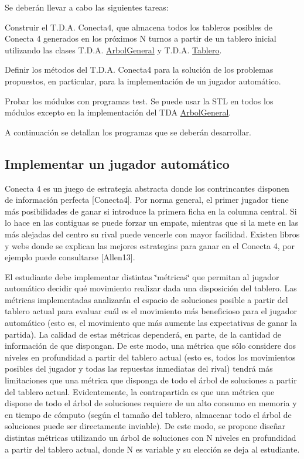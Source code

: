 Se deberán llevar a cabo las siguientes tareas\-:


\begin{DoxyEnumerate}
\item Construir el T.\-D.\-A. Conecta4, que almacena todos los tableros posibles de Conecta 4 generados en los próximos N turnos a partir de un tablero inicial utilizando las clases T.\-D.\-A. \hyperlink{classArbolGeneral}{Arbol\-General} y T.\-D.\-A. \hyperlink{classTablero}{Tablero}.
\item Definir los métodos del T.\-D.\-A. Conecta4 para la solución de los problemas propuestos, en particular, para la implementación de un jugador automático.
\item Probar los módulos con programas test. Se puede usar la S\-T\-L en todos los módulos excepto en la implementación del T\-D\-A \hyperlink{classArbolGeneral}{Arbol\-General}.
\end{DoxyEnumerate}

A continuación se detallan los programas que se deberán desarrollar.\hypertarget{index_jugador_automatico}{}\subsection{Implementar un jugador automático}\label{index_jugador_automatico}
Conecta 4 es un juego de estrategia abstracta donde los contrincantes disponen de información perfecta \mbox{[}Conecta4\mbox{]}. Por norma general, el primer jugador tiene más posibilidades de ganar si introduce la primera ficha en la columna central. Si lo hace en las contiguas se puede forzar un empate, mientras que si la mete en las más alejadas del centro su rival puede vencerle con mayor facilidad. Existen libros y webs donde se explican las mejores estrategias para ganar en el Conecta 4, por ejemplo puede consultarse \mbox{[}Allen13\mbox{]}.

El estudiante debe implementar distintas \char`\"{}métricas\char`\"{} que permitan al jugador automático decidir qué movimiento realizar dada una disposición del tablero. Las métricas implementadas analizarán el espacio de soluciones posible a partir del tablero actual para evaluar cuál es el movimiento más beneficioso para el jugador automático (esto es, el movimiento que más aumente las expectativas de ganar la partida). La calidad de estas métricas dependerá, en parte, de la cantidad de información de que dispongan. De este modo, una métrica que sólo considere dos niveles en profundidad a partir del tablero actual (esto es, todos los movimientos posibles del jugador y todas las repuestas inmediatas del rival) tendrá más limitaciones que una métrica que disponga de todo el árbol de soluciones a partir del tablero actual. Evidentemente, la contrapartida es que una métrica que dispone de todo el árbol de soluciones requiere de un alto consumo en memoria y en tiempo de cómputo (según el tamaño del tablero, almacenar todo el árbol de soluciones puede ser directamente inviable). De este modo, se propone diseñar distintas métricas utilizando un árbol de soluciones con N niveles en profundidad a partir del tablero actual, donde N es variable y su elección se deja al estudiante.

